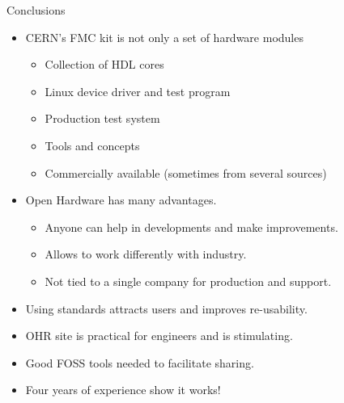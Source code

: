 \documentclass[compress,red]{beamer}
\begin{document}
\begin{frame}{Conclusions}

  \begin{block}{}
    \begin{itemize}
    \item CERN's FMC kit is not only a set of hardware modules
      \begin{itemize}
      \item Collection of HDL cores
      \item Linux device driver and test program
      \item Production test system
      \item Tools and concepts %
      \item Commercially available (sometimes from several sources)
      \end{itemize}
    \item Open Hardware has many advantages.
      \begin{itemize}
      \item Anyone can help in developments and make improvements.
      \item Allows to work differently with industry. %
      \item Not tied to a single company for production and support.
      \end{itemize}
    \item Using standards attracts users and improves re-usability. %
    \item OHR site is practical for engineers and is stimulating.
    \item Good FOSS tools needed to facilitate sharing.
    \item Four years of experience show it works!
    \end{itemize}
  \end{block}

  \note[item]{}

\end{frame}
\end{document}
